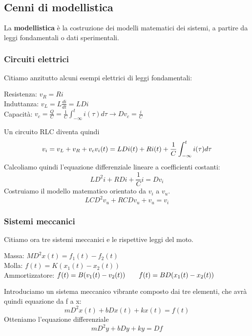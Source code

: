\documentclass[11pt]{article}
\begin{document}
\subsection{Cenni di modellistica}
La \textbf{modellistica} è la costruzione dei modelli matematici dei sistemi, a partire da leggi fondamentali o dati sperimentali.
\subsubsection{Circuiti elettrici}
Citiamo anzitutto alcuni esempi elettrici di leggi fondamentali:\\
\begin{center}
Resistenza: $v_R = Ri$\\
Induttanza: $v_L=L\frac{di}{dt} = LDi$\\
Capacità: $v_c = \frac{Q}{C} = \frac{1}{C} \int_{-\infty}^t i(\tau)d\tau \rightarrow Dv_c = \frac{i}{C}$\\
\end{center}

Un circuito RLC diventa quindi
\begin{displaymath}
    v_i=v_L+v_R+v_c\\
    v_i(t) = LDi(t) + Ri(t)+ \frac{1}{C} \int_{-\infty}^t i(\tau)d\tau
\end{displaymath}
Calcoliamo quindi l'equazione differenziale lineare a coefficienti costanti:
\begin{displaymath}
    LD^2i+RDi+\frac{1}{C}i = Dv_i
\end{displaymath}
Costruiamo il modello matematico orientato da $v_i$ a $v_u$.
\begin{displaymath}
    LCD^2 v_u + RCDv_u + v_u = v_i
\end{displaymath}
\subsubsection{Sistemi meccanici}
Citiamo ora tre sistemi meccanici e le rispettive leggi del moto.
\begin{center}
    Massa: $MD^2x(t) = f_1(t) - f_2(t)$\\
    Molla: $f(t)=K(x_1(t)-x_2(t))$\\
    Ammortizzatore: $f(t) = B(v_1(t)-v_2(t)) \hspace{20px} f(t) = BD(x_1(t)-x_2(t))$
\end{center}
Introduciamo un sistema meccanico vibrante composto dai tre elementi, che avrà quindi equazione da f a x:
\begin{displaymath}
    mD^2 x(t) + bDx(t) + kx(t) = f(t)
\end{displaymath}
Otteniamo l'equazione differenziale
\begin{displaymath}
    mD^2y+bDy+ky = Df
\end{displaymath}
\end{document}
